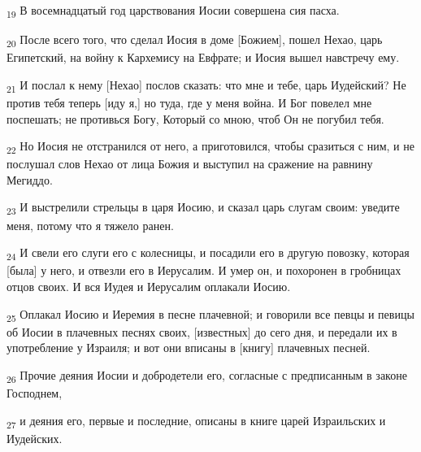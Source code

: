 \begin{tcolorbox}
\textsubscript{19} В восемнадцатый год царствования Иосии совершена сия пасха.
\end{tcolorbox}
\begin{tcolorbox}
\textsubscript{20} После всего того, что сделал Иосия в доме [Божием], пошел Нехао, царь Египетский, на войну к Кархемису на Евфрате; и Иосия вышел навстречу ему.
\end{tcolorbox}
\begin{tcolorbox}
\textsubscript{21} И послал к нему [Нехао] послов сказать: что мне и тебе, царь Иудейский? Не против тебя теперь [иду я,] но туда, где у меня война. И Бог повелел мне поспешать; не противься Богу, Который со мною, чтоб Он не погубил тебя.
\end{tcolorbox}
\begin{tcolorbox}
\textsubscript{22} Но Иосия не отстранился от него, а приготовился, чтобы сразиться с ним, и не послушал слов Нехао от лица Божия и выступил на сражение на равнину Мегиддо.
\end{tcolorbox}
\begin{tcolorbox}
\textsubscript{23} И выстрелили стрельцы в царя Иосию, и сказал царь слугам своим: уведите меня, потому что я тяжело ранен.
\end{tcolorbox}
\begin{tcolorbox}
\textsubscript{24} И свели его слуги его с колесницы, и посадили его в другую повозку, которая [была] у него, и отвезли его в Иерусалим. И умер он, и похоронен в гробницах отцов своих. И вся Иудея и Иерусалим оплакали Иосию.
\end{tcolorbox}
\begin{tcolorbox}
\textsubscript{25} Оплакал Иосию и Иеремия в песне плачевной; и говорили все певцы и певицы об Иосии в плачевных песнях своих, [известных] до сего дня, и передали их в употребление у Израиля; и вот они вписаны в [книгу] плачевных песней.
\end{tcolorbox}
\begin{tcolorbox}
\textsubscript{26} Прочие деяния Иосии и добродетели его, согласные с предписанным в законе Господнем,
\end{tcolorbox}
\begin{tcolorbox}
\textsubscript{27} и деяния его, первые и последние, описаны в книге царей Израильских и Иудейских.
\end{tcolorbox}
